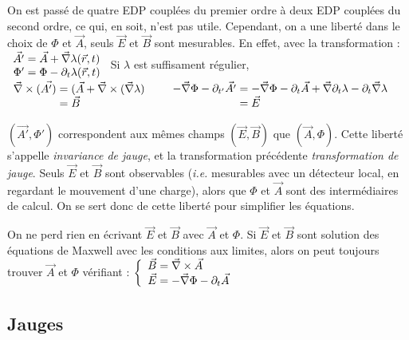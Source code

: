 	On est passé de quatre EDP couplées du premier ordre à deux EDP couplées du second ordre, ce qui, en soit, n'est pas utile. Cependant, on a une liberté dans le choix de $\Phi$ et $\vec{A}$, seuls $\vec{E}$ et $\vec{B}$ sont mesurables. En effet, avec la transformation :\\
\indent
	$ 
		\begin{array}{r@{\;}l}
				\vec{A'} &=\vec{A}+\nab\lambda(\vec{r},t)\\
			\Phi'&=\Phi-\partial_t\lambda(\vec{r},t)
		\end{array}\\
	$	
	Si $\lambda$ est suffisament régulier,\\
\indent
	$
		\begin{array}{r@{\;}l}
			\nab\times(\vec{A')}&=(\vec{A}+\nab\times(\nab\lambda)\\ 
			&=\vec{B}
		\end{array}\\[5pt]\indent
		\begin{array}{r@{\;}l}
			-\nab\Phi-\partial_{t'}\vec{A'}&=-\nab\Phi-\partial_t\vec{A}+\nab\partial_t\lambda-\partial_t\nab\lambda\\
			&=\vec{E}
		\end{array}
	$
	
	$(\vec{A'},\Phi')$ correspondent aux m\^emes champs $(\vec{E},\vec{B})$ que $(\vec{A},\Phi)$. Cette liberté s'appelle \emph{invariance de jauge}, et la transformation précédente \emph{transformation de jauge}. Seuls $\vec{E}$ et $\vec{B}$ sont observables ({\it i.e.} mesurables avec un détecteur local, en regardant le mouvement d'une charge), alors que $\Phi$ et $\vec{A}$ sont des intermédiaires de calcul. On se sert donc de cette liberté pour simplifier les équations.
\begin{remark}
	On ne perd rien en écrivant $\vec{E}$ et $\vec{B}$ avec $\vec{A}$ et $\Phi$. Si $\vec{E}$ et $\vec{B}$ sont solution des équations de Maxwell avec les conditions aux limites, alors on peut toujours trouver $\vec{A}$ et $\Phi$ vérifiant :
	\indent
	$
		\left\{ \begin{array}{r@{\;}l}
			\vec{B}&=\nab\times\vec{A}\\
			\vec{E}&=-\nab\Phi-\partial_t\vec{A}\\
		\end{array} \right.
	$
\end{remark}

\subsection{Jauges}
